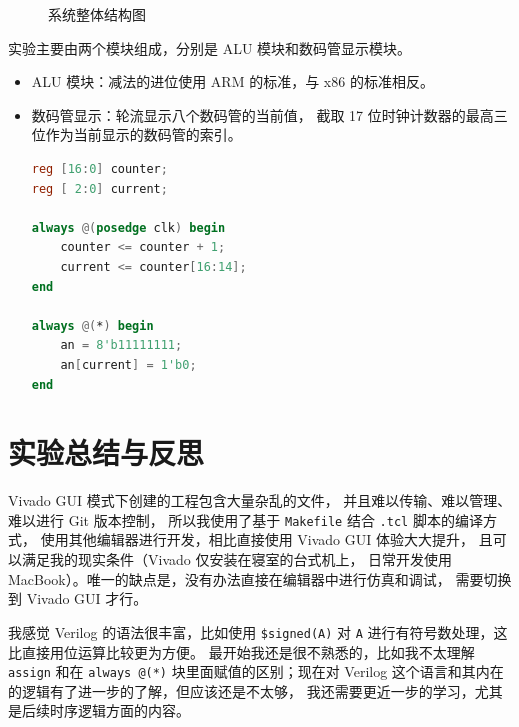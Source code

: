 \documentclass[12pt, a4paper]{ctexart}
\begin{document}
\begin{figure}[h]
    \centering
    \caption{系统整体结构图}
    \label{fig:sys}
\end{figure}

实验主要由两个模块组成，分别是 ALU 模块和数码管显示模块。

\begin{itemize}
    \item ALU 模块：减法的进位使用 ARM 的标准，与 x86 的标准相反。
    \item 数码管显示：轮流显示八个数码管的当前值，
    截取 17 位时钟计数器的最高三位作为当前显示的数码管的索引。
    \begin{lstlisting}[language=Verilog]
reg [16:0] counter;
reg [ 2:0] current;

always @(posedge clk) begin
    counter <= counter + 1;
    current <= counter[16:14];
end

always @(*) begin
    an = 8'b11111111;
    an[current] = 1'b0;
end
    \end{lstlisting}
\end{itemize}

\section{实验总结与反思}

Vivado GUI 模式下创建的工程包含大量杂乱的文件，
并且难以传输、难以管理、难以进行 Git 版本控制，
所以我使用了基于 \texttt{Makefile} 结合 \texttt{.tcl} 脚本的编译方式，
使用其他编辑器进行开发，相比直接使用 Vivado GUI 体验大大提升，
且可以满足我的现实条件（Vivado 仅安装在寝室的台式机上，
日常开发使用 MacBook）。唯一的缺点是，没有办法直接在编辑器中进行仿真和调试，
需要切换到 Vivado GUI 才行。

我感觉 Verilog 的语法很丰富，比如使用 \texttt{\$signed(A)}
对 \texttt{A} 进行有符号数处理，这比直接用位运算比较更为方便。
最开始我还是很不熟悉的，比如我不太理解 \texttt{assign} 和在
\texttt{always @(*)} 块里面赋值的区别；现在对 Verilog
这个语言和其内在的逻辑有了进一步的了解，但应该还是不太够，
我还需要更近一步的学习，尤其是后续时序逻辑方面的内容。
\end{document}
